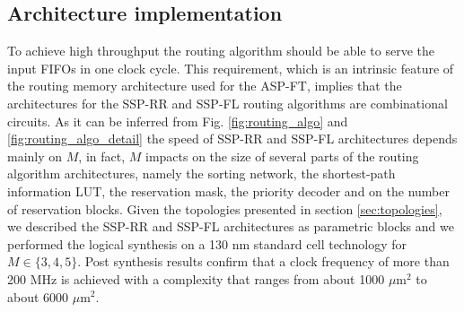 \documentclass[10pt,twocolumn,journal]{IEEEtran}
\begin{document}
\subsection{Architecture implementation}
To achieve high throughput the routing algorithm should be able to serve the input FIFOs in one clock cycle. 
This requirement, which is an intrinsic feature of the routing memory architecture used for the ASP-FT,  
implies that the architectures for the SSP-RR and SSP-FL routing algorithms are combinational circuits. 
As it can be inferred from Fig. \ref{fig:routing_algo} and \ref{fig:routing_algo_detail} 
the speed of SSP-RR and SSP-FL architectures depends mainly on $M$, in fact, $M$ impacts on the size of several parts of the routing algorithm architectures, namely 
the sorting network, the shortest-path information LUT, the reservation mask, the priority decoder and on the number 
of reservation blocks.
Given the topologies presented in section \ref{sec:topologies}, we described the SSP-RR and SSP-FL architectures 
as parametric blocks and we performed the logical synthesis on a 130 nm standard cell technology for $M \in \{3, 4, 5\}$. 
Post synthesis results confirm that a clock frequency of more than 200 MHz is achieved with a complexity that ranges 
from about 1000 $\mu$m$^2$ to about 6000 $\mu$m$^2$.
\end{document}
